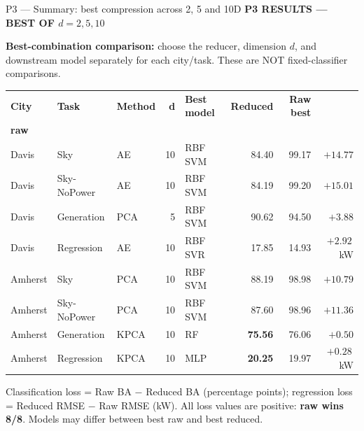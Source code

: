 \documentclass[aspectratio=169,11pt]{beamer}
\newcommand{\sectiontag}[1]{{\footnotesize\usebeamercolor[fg]{structure}\textbf{#1}}\par\vspace{0.10cm}}
\newcommand{\smallmuted}[1]{{\footnotesize\color{slate}#1\par}}
\begin{document}
\begin{frame}{P3 — Summary: best compression across 2, 5 and 10D}
\sectiontag{P3 \quad RESULTS — BEST OF $d=2,5,10$}
\smallmuted{\textbf{Best-combination comparison:} choose the reducer, dimension $d$, and downstream model separately for each city/task. These are NOT fixed-classifier comparisons.}\par\vspace{0.12cm}
{\fontsize{8.0}{9.5}\selectfont
\setlength{\tabcolsep}{3.9pt}\renewcommand{\arraystretch}{1.28}
\begin{tabular}{@{}lllrlrrr@{}}\toprule
\textbf{City} & \textbf{Task} & \textbf{Method} & \textbf{d} & \textbf{Best model} & \textbf{Reduced} & \textbf{Raw best} & \shortstack{\textbf{Loss vs}\\\textbf{raw}}\\\midrule
Davis & Sky & AE & 10 & RBF SVM & 84.40 & 99.17 & \textcolor{warn}{$+14.77$}\\
Davis & Sky-NoPower & AE & 10 & RBF SVM & 84.19 & 99.20 & \textcolor{warn}{$+15.01$}\\
Davis & Generation & PCA & 5 & RBF SVM & 90.62 & 94.50 & $+3.88$\\
Davis & Regression & AE & 10 & RBF SVR & 17.85 & 14.93 & $+2.92$\,kW\\
\midrule
Amherst & Sky & PCA & 10 & RBF SVM & 88.19 & 98.98 & \textcolor{warn}{$+10.79$}\\
Amherst & Sky-NoPower & PCA & 10 & RBF SVM & 87.60 & 98.96 & \textcolor{warn}{$+11.36$}\\
Amherst & Generation & KPCA & 10 & RF & \textbf{75.56} & 76.06 & $+0.50$\\
Amherst & Regression & KPCA & 10 & MLP & \textbf{20.25} & 19.97 & $+0.28$\,kW\\
\bottomrule\end{tabular}}\par\vspace{0.18cm}
\smallmuted{Classification loss = Raw BA $-$ Reduced BA (percentage points); regression loss = Reduced RMSE $-$ Raw RMSE (kW). All loss values are positive: \textbf{raw wins 8/8}. Models may differ between best raw and best reduced.}
\end{frame}
\end{document}

